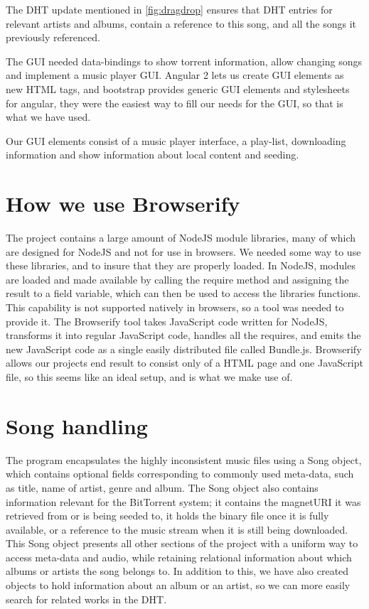 The DHT update mentioned in \ref{fig:dragdrop} ensures that DHT entries for relevant artists and albums,
contain a reference to this song,
and all the songs it previously referenced.
\newline

The \acs{GUI} needed data-bindings to show torrent information, allow changing songs
and implement a music player \acs{GUI}. 
Angular 2 lets us create \acs{GUI} elements as new \acs{HTML} tags, 
and bootstrap provides generic \acs{GUI} elements and stylesheets for angular, 
they were the easiest way to fill our needs for the \acs{GUI},
so that is what we have used.

Our \acs{GUI} elements consist of a music player interface, a play-list, downloading information 
and show information about local content and seeding.
\newline

\section{How we use Browserify}
The project contains a large amount of NodeJS module libraries, 
many of which are designed for NodeJS and not for use in browsers.
We needed some way to use these libraries, and to insure that they are properly loaded.
In NodeJS, modules are loaded and made available by calling the require method 
and assigning the result to a field variable, which can then be used to access the libraries functions.
This capability is not supported natively in browsers, so a tool was needed to provide it.
The Browserify tool takes JavaScript code written for NodeJS, 
transforms it into regular JavaScript code, 
handles all the requires, 
and emits the new JavaScript code as a single easily distributed file called Bundle.js.
Browserify allows our projects end result to consist only of a \acs{HTML} page and one JavaScript file, 
so this seems like an ideal setup, and is what we make use of.
\newline

\section{Song handling}
The program encapsulates the highly inconsistent music files using a Song object,
which contains optional fields corresponding to commonly used meta-data, 
such as title, name of artist, genre and album. 
The Song object also contains information relevant for the BitTorrent system; 
it contains the magnetURI it was retrieved from or is being seeded to, 
it holds the binary file once it is fully available, 
or a reference to the music stream when it is still being downloaded.
This Song object presents all other sections of the project with a uniform way to access meta-data and audio, 
while retaining relational information about which albums or artists the song belongs to. In addition to this, 
we have also created objects to hold information about an album or an artist, 
so we can more easily search for related works in the \acs{DHT}.
\newline

